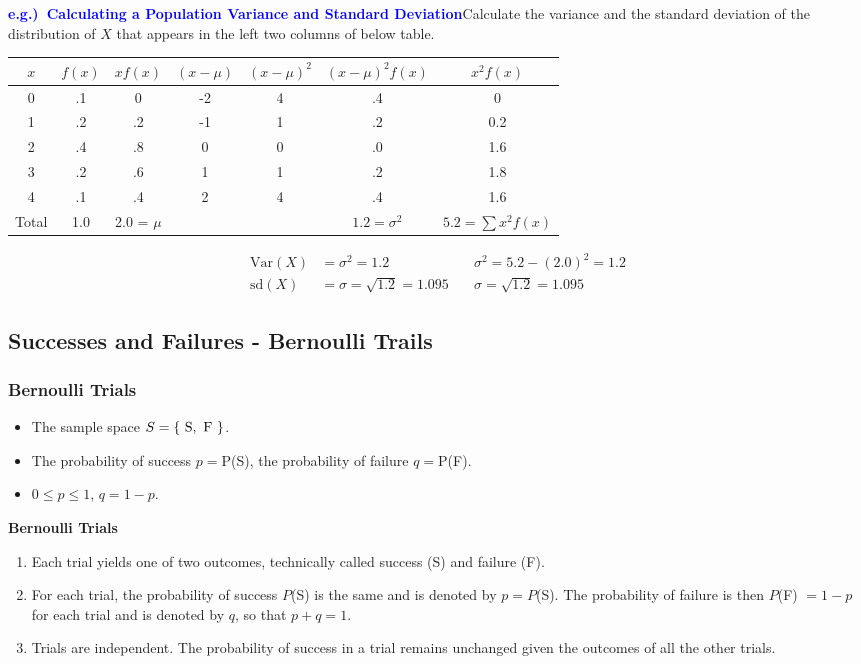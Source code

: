\documentclass[12pt,a4paper]{article}
\newcommand{\eg}{\textcolor{blue}{\bf e.g.)\ }}
\newcommand{\Var}{\text{Var}}
\newcommand{\sd}{\text{sd}}
\begin{document}
\eg\textcolor{blue}{\bf Calculating a Population Variance and Standard Deviation}\quad Calculate the variance and the standard deviation of the distribution of $X$ that appears in the left two columns of below table.
\begin{center}\begin{tabular}{c|c||cccc||c}
	\toprule[1.2pt]
	$x$ & $f(x)$ & $xf(x)$ & $(x-\mu)$ & $(x-\mu)^2$ & $(x-\mu)^2f(x)$ & $x^2f(x)$\\
	\hline
	0&.1& 0 & -2&4&.4&0\\
	1&.2& .2& -1&1&.2&0.2\\
	2&.4& .8& 0&0&.0&1.6\\
	3&.2& .6& 1&1&.2&1.8\\
	4&.1& .4& 2&4&.4&1.6\\
	\hline
	Total&1.0&2.0 = $\mu$&&&$1.2=\sigma^2$&$5.2=\sum x^2f(x)$\\
\end{tabular}
\end{center}\begin{align*}
\Var(X)&=\sigma^2=1.2\quad& \sigma^2=5.2-(2.0)^2=1.2 \\
\sd(X)&=\sigma=\sqrt{1.2}=1.095\quad& \sigma=\sqrt{1.2}=1.095
\end{align*}

\subsection{Successes and Failures - Bernoulli Trails}

\subsubsection{Bernoulli Trials}
\begin{itemize}
	\item The sample space $S = \set{\ \text{S},\ \text{F}\ }$.
	\item The probability of success $p=$P(S), the probability of failure $q=$P(F).
	\item $0\leq p\leq 1$, $q=1-p$.
\end{itemize}
\begin{tcolorbox}[colback=white]
	\centering
	\textbf{Bernoulli Trials} \begin{enumerate}
		\item Each trial yields one of two outcomes, technically called success (S) and failure (F).
		\item For each trial, the probability of success $P$(S) is the same and is denoted by $p = P$(S). The probability of failure is then $P$(F) $= 1-p$ for each trial and is denoted by $q$, so that $p+q=1$.
		\item Trials are independent. The probability of success in a trial remains unchanged given the outcomes of all the other trials.	
\end{enumerate}
\end{tcolorbox}
\end{document}
